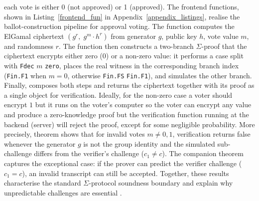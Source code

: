 each vote is either 0 (not approved) or 1 (approved).  The frontend functions, shown in Listing~\ref{frontend_fun} in Appendix~\ref{appendix_listings}, realise the ballot-construction pipeline for approval voting. The function \texttt{} computes the ElGamal ciphertext $(g^r,\; g^m \cdot h^r)$ from generator $g$, public key $h$, vote value $m$, and randomness $r$. The function \texttt{} then constructs a two-branch $\Sigma$-proof that the ciphertext encrypts either zero ($0$) or a non-zero value: it performs a case split with \texttt{Fdec} $m$ \texttt{zero}, places the real witness in the corresponding branch index (\texttt{Fin.F1} when $m=0$, otherwise \texttt{Fin.FS} \texttt{Fin.F1}), and simulates the other branch. Finally, \texttt{} composes both steps and returns the ciphertext together with its proof as a single object for verification. Ideally, for the non-zero case a voter should encrypt $1$ but it runs on the voter's computer so the voter can encrypt any value and produce a zero-knowledge proof but the verification function running at the backend (server) will reject the proof, except for some negligible probability. More precisely, theorem \texttt{} shows that for invalid votes $m \neq 0,1$, verification returns false whenever the generator $g$ is not the group identity and the simulated sub-challenge differs from the verifier's challenge ($c_1 \neq c$). The companion theorem \texttt{} captures the exceptional case: if the prover can predict the verifier challenge ($c_1 = c$), an invalid transcript can still be accepted. Together, these results characterise the standard $\Sigma$-protocol soundness boundary and explain why unpredictable challenges are essential \cite{10.1007/978-3-642-34961-4_38,dao2023weak}. 

